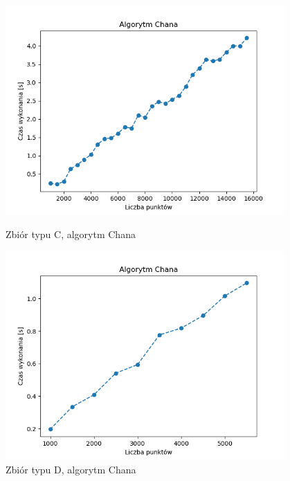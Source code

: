 \documentclass[11pt]{article}
\theoremstyle{remark} \newtheorem{definition}{def.}
\theoremstyle{definition} \newtheorem{twierdzenie}{tw.}
\begin{document}
\begin{figure}[]
    \centering
    \begin{minipage}{0.48\textwidth}
        \centering
        \includegraphics[width=0.95\textwidth]{../tests/prost-chan.png} %
        \caption{Zbiór typu C, algorytm Chana}
        \label{fig:prost-chan}
    \end{minipage}\hfill
    \begin{minipage}{0.48\textwidth}
        \centering
        \includegraphics[width=0.95\textwidth]{../tests/kw-chan.png} %
        \caption{Zbiór typu D, algorytm Chana}
        \label{fig:kw-chan}
    \end{minipage}
\end{figure}
\end{document}
